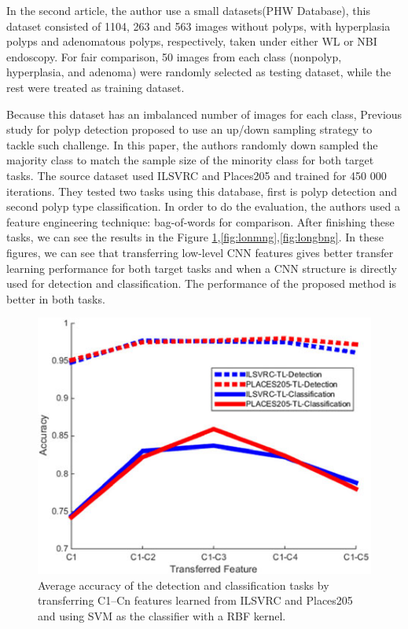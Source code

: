 \documentclass[10pt,twocolumn,letterpaper]{article}
\begin{document}
In the second article\cite{zhang2017automatic}, the author use a small datasets(PHW Database), this dataset consisted of 1104, 263 and
563 images without polyps, with hyperplasia polyps and adenomatous polyps, respectively, taken under either WL or NBI endoscopy. For fair comparison, 50 images from each class (nonpolyp, hyperplasia, and adenoma) were randomly selected as testing dataset, while the rest were treated as training dataset.

Because this dataset has an imbalanced number of images for each class, Previous study for polyp detection proposed to use an up/down sampling strategy to tackle such challenge. In this paper, the authors randomly down sampled the majority class to match the sample size of the minority class for both target tasks. The source dataset used ILSVRC and Places205 and trained for 450 000 iterations. They tested two tasks using this database, first is polyp detection and second polyp type classification. In order to do the evaluation, the authors used a feature engineering technique: bag-of-words for comparison. After finishing these tasks, we can see the results in the Figure \ref{fig:lofghmng},\ref{fig:lonmng},\ref{fig:longbng}. In these figures, we can see that transferring low-level CNN features gives better transfer learning performance for both target tasks and when a CNN structure is directly
used for detection and classification. The performance of the proposed method is better in both tasks.

\begin{figure}[t]
	\begin{center}
		\includegraphics[width=0.8\linewidth]{Pic/6.jpg}
	\end{center}
	\caption{Average accuracy of the detection and classification tasks by transferring C1–Cn features learned from ILSVRC and Places205 and using SVM as the classifier with a RBF kernel.}
	\label{fig:lofghmng}

\end{figure}
\end{document}
